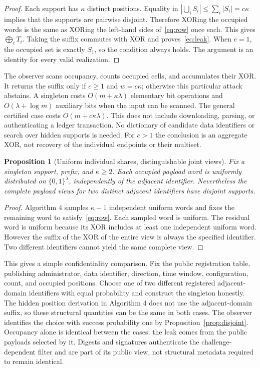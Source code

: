 \documentclass[11pt]{article}
\newtheorem{proposition}{Proposition}
\begin{document}
\begin{proof}
Each support has $\kappa$ distinct positions. Equality in
$|\bigcup_i S_i|\leq\sum_i|S_i|=c\kappa$ implies that the supports are pairwise
disjoint. Therefore XORing the occupied words is the same as XORing the
left-hand sides of~\eqref{eq:row} once each. This gives $\bigoplus_i T_i$.
Taking the suffix commutes with XOR and proves~\eqref{eq:leak}.
When $c=1$, the occupied set is exactly $S_1$, so the condition always holds.
The argument is an identity for every valid realization.
\end{proof}

The observer scans occupancy, counts occupied cells, and accumulates their
XOR. It returns the suffix only if $c\geq1$ and $w=c\kappa$; otherwise this
particular attack abstains. A singleton costs $O(m+\kappa\lambda)$ elementary
bit operations and $O(\lambda+\log m)$ auxiliary bits when the input can be
scanned. The general certified case costs $O(m+c\kappa\lambda)$. This does not
include downloading, parsing, or authenticating a ledger transaction. No
dictionary of candidate data identifiers or search over hidden supports is
needed. For $c>1$ the conclusion is an aggregate XOR, not recovery of the
individual endpoints or their multiset.

\begin{proposition}[Uniform individual shares, distinguishable joint views]
\label{prop:joint}
Fix a singleton support, prefix, and $\kappa\geq2$. Each occupied payload word
is uniformly distributed on $\{0,1\}^{\lambda}$, independently of the adjacent
identifier. Nevertheless the complete payload views for two distinct adjacent
identifiers have disjoint supports.
\end{proposition}

\begin{proof}
Algorithm 4 samples $\kappa-1$ independent uniform words and fixes the remaining
word to satisfy~\eqref{eq:row}. Each sampled word is uniform. The residual word
is uniform because its XOR includes at least one independent uniform word.
However the suffix of the XOR of the entire view is always the specified
identifier. Two different identifiers cannot yield the same complete view.
\end{proof}

This gives a simple confidentiality comparison. Fix the public registration
table, publishing administrator, data identifier, direction, time window,
configuration, count, and occupied positions. Choose one of two different
registered adjacent-domain identifiers with equal probability and construct
the singleton honestly. The hidden position derivation in Algorithm 4 does
not use the adjacent-domain suffix, so these structural quantities can be the
same in both cases. The observer identifies the choice with success
probability one by Proposition~\ref{prop:disjoint}. Occupancy alone is identical
between the cases; the leak comes from the public payloads selected by it.
Digests and signatures authenticate the challenge-dependent filter and are
part of its public view, not structural metadata required to remain identical.
\end{document}
